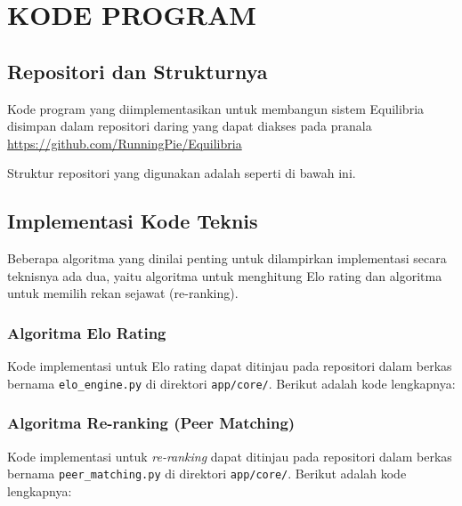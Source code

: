 \cleardoublepage
\chapter{KODE PROGRAM}

\section{Repositori dan Strukturnya}
Kode program yang diimplementasikan untuk membangun sistem Equilibria disimpan dalam repositori daring yang dapat diakses pada pranala
\url{https://github.com/RunningPie/Equilibria}

Struktur repositori yang digunakan adalah seperti di bawah ini.



\section{Implementasi Kode Teknis}
Beberapa algoritma yang dinilai penting untuk dilampirkan implementasi secara teknisnya ada dua, yaitu algoritma untuk menghitung Elo rating dan algoritma untuk memilih rekan sejawat (re-ranking).

\subsection{Algoritma Elo Rating}
Kode implementasi untuk Elo rating dapat ditinjau pada repositori dalam berkas bernama \texttt{elo\_engine.py} di direktori \texttt{app/core/}. Berikut adalah kode lengkapnya:



\subsection{Algoritma Re-ranking (Peer Matching)}
Kode implementasi untuk \textit{re-ranking} dapat ditinjau pada repositori dalam berkas bernama \texttt{peer\_matching.py} di direktori \texttt{app/core/}. Berikut adalah kode lengkapnya:


